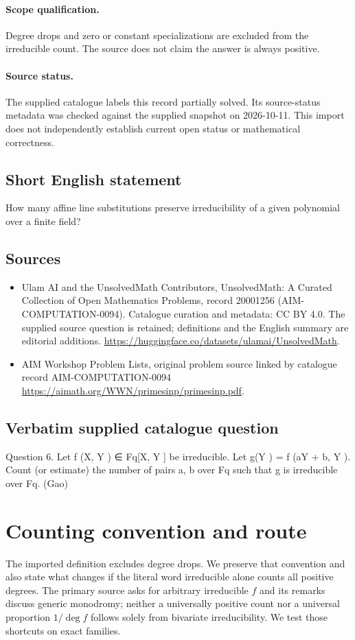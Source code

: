 \documentclass[11pt]{article}
\begin{document}
\paragraph{Scope qualification.}
Degree drops and zero or constant specializations are excluded from the irreducible count. The source does not claim the answer is always positive.
\paragraph{Source status.}
The supplied catalogue labels this record partially solved. Its source-status metadata was checked against the supplied snapshot on 2026-10-11. This import does not independently establish current open status or mathematical correctness.
\subsection{Short English statement}
How many affine line substitutions preserve irreducibility of a given polynomial over a finite field?
\subsection{Sources}
\begin{itemize}
\item[S1] Ulam AI and the UnsolvedMath Contributors, UnsolvedMath: A Curated Collection of Open Mathematics Problems, record 20001256 (AIM-COMPUTATION-0094). Catalogue curation and metadata: CC BY 4.0. The supplied source question is retained; definitions and the English summary are editorial additions.
\url{https://huggingface.co/datasets/ulamai/UnsolvedMath}.
\item[S2] AIM Workshop Problem Lists, original problem source linked by catalogue record AIM-COMPUTATION-0094
\url{https://aimath.org/WWN/primesinp/primesinp.pdf}.
\end{itemize}
\subsection{Verbatim supplied catalogue question}
Question 6. Let f (X, Y ) ∈ Fq[X, Y ] be irreducible. Let g(Y ) = f (aY + b, Y ). Count (or estimate) the number of pairs a, b over Fq such that g is irreducible over Fq. (Gao)

\section{Counting convention and route}
The imported definition excludes degree drops. We preserve that convention
and also state what changes if the literal word irreducible alone counts
all positive degrees. The primary source asks for arbitrary irreducible
$f$ and its remarks discuss generic monodromy; neither a universally
positive count nor a universal proportion $1/\deg f$ follows solely
from bivariate irreducibility. We test those shortcuts on exact families.
\end{document}
